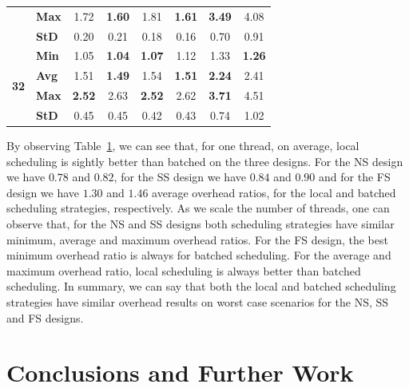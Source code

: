 \documentclass{llncs}
\begin{document}
\begin{table}[!ht]
\begin{tabular}{ll|cc|cc|cc}
& {\bf Max }& 1.72& {\bf 1.60}& 1.81& {\bf 1.61}& {\bf 3.49}& 4.08\\
& {\bf StD }& 0.20& 0.21& 0.18& 0.16& 0.70& 0.91\\
\hline
\multirow{4}{*}{\bf 32}
& {\bf Min }& 1.05& {\bf 1.04}& {\bf 1.07}& 1.12& 1.33& {\bf 1.26}\\
& {\bf Avg }& 1.51& {\bf 1.49}& 1.54& {\bf 1.51}& {\bf 2.24}& 2.41\\
& {\bf Max }& {\bf 2.52}& 2.63& {\bf 2.52}& 2.62& {\bf 3.71}& 4.51\\
& {\bf StD }& 0.45& 0.45& 0.42& 0.43& 0.74& 1.02\\
\hline\hline
\end{tabular}%
\label{tab_batched_overhead}
\end{table}

By observing Table~\ref{tab_batched_overhead}, we can see that, for
one thread, on average, local scheduling is sightly better than
batched on the three designs. For the NS design we have $0.78$ and
$0.82$, for the SS design we have $0.84$ and $0.90$ and for the FS
design we have $1.30$ and $1.46$ average overhead ratios, for the
local and batched scheduling strategies, respectively. As we scale the
number of threads, one can observe that, for the NS and SS designs
both scheduling strategies have similar minimum, average and maximum
overhead ratios. For the FS design, the best minimum overhead ratio is
always for batched scheduling. For the average and maximum overhead
ratio, local scheduling is always better than batched scheduling. In
summary, we can say that both the local and batched scheduling
strategies have similar overhead results on worst case scenarios for
the NS, SS and FS designs.


\section{Conclusions and Further Work}







\end{document}

